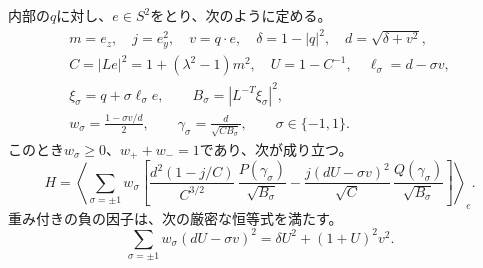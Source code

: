\begin{lemma}[有界な弦表示]
\label{lem:pt-chord-representation}
内部の$q$に対し、$e\in S^2$をとり、次のように定める。
\begin{equation}
\begin{gathered}
 m=e_z,\quad j=e_y^2,\quad v=q\cdot e,\quad
 \delta=1-|q|^2,\quad d=\sqrt{\delta+v^2},\\
 C=|Le|^2=1+(\lambda^2-1)m^2,\quad
 U=1-C^{-1},\quad \ell_\sigma=d-\sigma v,\\
 \xi_\sigma=q+\sigma\ell_\sigma e,\qquad
 B_\sigma=|L^{-T}\xi_\sigma|^2,\\
 w_\sigma=\frac{1-\sigma v/d}{2},\qquad
 \gamma_\sigma=\frac{d}{\sqrt{CB_\sigma}},
 \qquad \sigma\in\{-1,1\}.
\end{gathered}
\label{eq:pt-chord-variables}
\end{equation}
このとき$w_\sigma\geq0$、$w_++w_-=1$であり、次が成り立つ。
\begin{equation}
 H=\left\langle
 \sum_{\sigma=\pm1}w_\sigma
 \left[
 \frac{d^2(1-j/C)}{C^{3/2}}\,
 \frac{P(\gamma_\sigma)}{\sqrt{B_\sigma}}
 -
 \frac{j(dU-\sigma v)^2}{\sqrt C}\,
 \frac{Q(\gamma_\sigma)}{\sqrt{B_\sigma}}
 \right]\right\rangle_e .
\label{eq:pt-chord-hessian}
\end{equation}
重み付きの負の因子は、次の厳密な恒等式を満たす。
\begin{equation}
 \sum_{\sigma=\pm1}w_\sigma(dU-\sigma v)^2
 =\delta U^2+(1+U)^2v^2.
\label{eq:pt-paired-negative-identity}
\end{equation}
\end{lemma}

